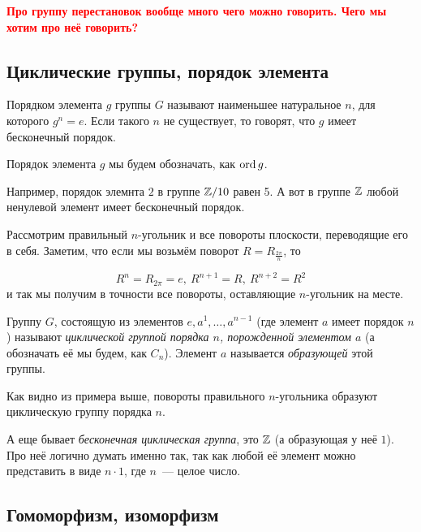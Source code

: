 	\textcolor{red}{\bf{Про группу перестановок вообще много чего можно говорить. Чего мы хотим про неё говорить?}}

	\subsection{Циклические группы, порядок элемента}

	\begin{definition} 
		Порядком элемента $g$ группы $G$ называют наименьшее натуральное $n$, для которого $g^n = e$. Если такого $n$ не существует, то говорят, что $g$ имеет бесконечный порядок. 

		Порядок элемента $g$ мы будем обозначать, как $\operatorname{ord}{g}$.
	\end{definition}

	\begin{example}
		Например, порядок элемнта $2$ в группе $\mathbb{Z}/10$ равен 5. А вот в группе $\mathbb{Z}$ любой ненулевой элемент имеет бесконечный порядок. 
	\end{example} 

	\begin{example}
		Рассмотрим правильный $n$-угольник и все повороты плоскости, переводящие его в себя. Заметим, что если мы возьмём поворот $R = R_{\frac{2\pi}{n}}$, то 

		\[
			R^n = R_{2\pi} = e,\  R^{n + 1} = R, \ R^{n + 2} = R^2 
		\]
		и так мы получим в точности все повороты, оставляющие $n$-угольник на месте. 
	\end{example}

	\begin{definition} 
		Группу $G$, состоящую из элементов $e, a^1, \ldots, a^{n - 1}$ (где элемент $a$ имеет порядок $n$) называют \emph{циклической группой порядка $n$, порожденной элементом $a$} (а обозначать её мы будем, как $C_n$). Элемент $a$ называется \emph{образующей} этой группы. 
	\end{definition}

	Как видно из примера выше, повороты правильного $n$-угольника образуют циклическую группу порядка $n$.

	\begin{remark}
		А еще бывает \emph{бесконечная циклическая группа}, это $\mathbb{Z}$ (а образующая у неё $1$). Про неё логично думать именно так, так как любой её элемент можно представить в виде $n \cdot 1$, где $n$~--- целое число.
	\end{remark}

	\subsection{Гомоморфизм, изоморфизм}

